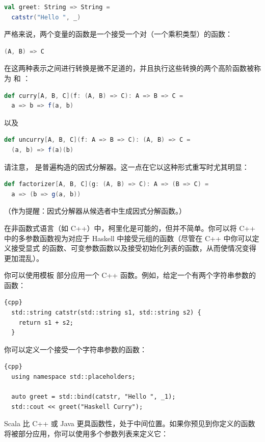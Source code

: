 \begin{lstlisting}[language=Scala]
val greet: String => String =
  catstr("Hello ", _)
\end{lstlisting}
严格来说，两个变量的函数是一个接受一个对（一个乘积类型）的函数：

\begin{lstlisting}[language=Scala]
(A, B) => C
\end{lstlisting}
在这两种表示之间进行转换是微不足道的，并且执行这些转换的两个高阶函数被称为 和 ：

\begin{lstlisting}[language=Scala]
def curry[A, B, C](f: (A, B) => C): A => B => C =
  a => b => f(a, b)
\end{lstlisting}
以及

\begin{lstlisting}[language=Scala]
def uncurry[A, B, C](f: A => B => C): (A, B) => C =
  (a, b) => f(a)(b)
\end{lstlisting}
请注意， 是普遍构造的因式分解器。这一点在它以这种形式重写时尤其明显：

\begin{lstlisting}[language=Scala]
def factorizer[A, B, C](g: (A, B) => C): A => (B => C) =
  a => (b => g(a, b))
\end{lstlisting}
（作为提醒：因式分解器从候选者中生成因式分解函数。）

在非函数式语言（如 C++）中，柯里化是可能的，但并不简单。你可以将 C++ 中的多参数函数视为对应于 Haskell 中接受元组的函数（尽管在 C++ 中你可以定义接受显式  的函数、可变参数函数以及接受初始化列表的函数，从而使情况变得更加混乱）。

你可以使用模板  部分应用一个 C++ 函数。例如，给定一个有两个字符串参数的函数：

\begin{lstlisting}{cpp}
  std::string catstr(std::string s1, std::string s2) {
    return s1 + s2;
  }
\end{lstlisting}
你可以定义一个接受一个字符串参数的函数：

\begin{lstlisting}{cpp}
  using namespace std::placeholders;

  auto greet = std::bind(catstr, "Hello ", _1);
  std::cout << greet("Haskell Curry");
\end{lstlisting}
Scala 比 C++ 或 Java 更具函数性，处于中间位置。如果你预见到你定义的函数将被部分应用，你可以使用多个参数列表来定义它：

